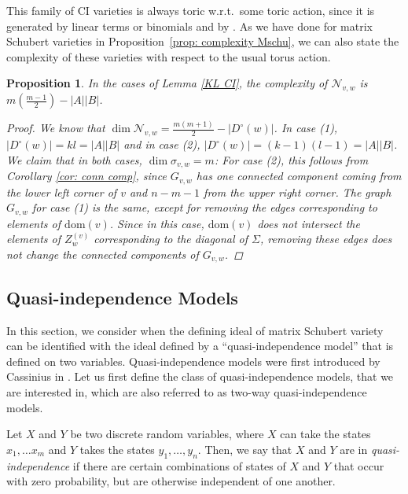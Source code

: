 \documentclass[11pt]{amsart}
\newtheorem{proposition}[theorem]{Proposition}
\theoremstyle{definition}
\theoremstyle{definition}
\theoremstyle{definition}
\theoremstyle{definition}
\newcommand{\dom}{\mathrm{dom}}
\newcommand{\Gvwt}{G_{v,w}}
\newcommand{\Dc}{D^{\circ}}
\newcommand{\Zg}{Z^{(v)}_w}
\begin{document}
\noindent 
This family of CI varieties is always toric w.r.t.\ some toric action, since it is generated by linear terms or binomials and by \cite[Theorem 1.1]{biaggi2025binomiality}. 
As we have done for matrix Schubert varieties in Proposition~\ref{prop: complexity Mschu}, we can also state the complexity of these varieties with respect to the usual torus action. 

\begin{proposition}
    In the cases of Lemma \ref{KL CI}, the complexity of $\mathcal N_{v,w}$ is $m (\frac{m-1}{2})-|A||B|$.
    \begin{proof}
    		We know that $\dim \mathcal N_{v,w} = \frac{m(m+1)}{2}- |\Dc(w)|	$.
    		In case (1), $|\Dc(w)|= kl = |A||B|$ and in           		case (2),
    		$|\Dc(w)| = (k-1)(l-1) = |A||B|$.
    		We claim that in both cases, $\dim \sigma_{v,w} = m$: For case (2), this follows from Corollary \ref{cor: conn comp}, since $\Gvwt$ has one connected component coming from the lower left corner of $v$ and $n-m-1$ from the upper right corner. The graph $\Gvwt$ for case (1) is the same, except for removing the edges corresponding to elements of $\dom(v)$. 
            Since in this case, $\dom(v)$ does not intersect the elements of $\Zg$ corresponding to the diagonal of $\Sigma$, removing these edges does not change the connected components of $\Gvwt$.
    \end{proof}
\end{proposition}

\subsection{Quasi-independence Models}
\noindent In this section, we consider when the defining ideal of matrix Schubert variety can be identified with the ideal defined by a ``quasi-independence model'' that is defined on two variables. Quasi-independence models were first introduced by Cassinius in \cite{caussinus1965contribution}. Let us first define the class of quasi-independence models, that we are interested in, which are also referred to as two-way quasi-independence models.

Let $X$ and $Y$ be two discrete random variables, where $X$ can take the states $x_1, \ldots x_m$ and $Y$ takes the states $y_1,\ldots,y_n$. Then, we say that $X$ and $Y$ are in \emph{quasi-independence} if there are certain combinations of states of $X$ and $Y$ that occur with zero probability, but are otherwise independent of one another. 
\end{document}
